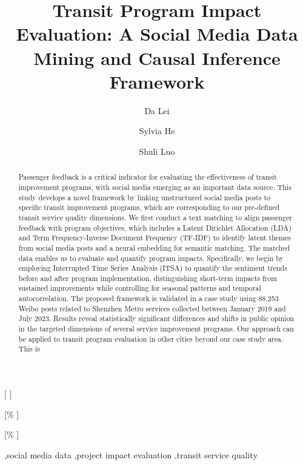 \documentclass[a4paper,fleqn,12pt]{cas-sc}
\begin{document}
\let\WriteBookmarks\relax
\def\floatpagepagefraction{1}
\def\textpagefraction{.001}

\title [mode = title]{Transit Program Impact Evaluation: A Social Media Data Mining and Causal Inference Framework} 

\author[1]{Da Lei}[%
]

\address[1]{Department of Geography and Resource Management, The Chinese University of Hong Kong, Hong Kong, China}
\address[2]{School of Humanities and Social Science, The Chinese University of Hong Kong, Shenzhen, China}


\author[1]{Sylvia He}[\%
]
\cormark[1]

\author[2]{Shuli Luo}[\%
]



\begin{abstract}
Passenger feedback is a critical indicator for evaluating the effectiveness of transit improvement programs, with social media emerging as an important data source. This study develops a novel framework by linking unstructured social media posts to specific transit improvement programs, which are corresponding to our pre-defined transit service quality dimensions. We first conduct a text matching to align passenger feedback with program objectives, which includes a Latent Dirichlet Allocation (LDA) and Term Frequency-Inverse Document Frequency (TF-IDF) to identify latent themes from social media posts and a neural embedding for semantic matching. The matched data enables us to evaluate and quantify program impacts. Specifically, we begin by employing Interrupted Time Series Analysis (ITSA) to quantify the sentiment trends before and after program implementation, distinguishing short-term impacts from sustained improvements while controlling for seasonal patterns and temporal autocorrelation. The proposed framework is validated in a case study using 88,253 Weibo posts related to Shenzhen Metro services collected between January 2019 and July 2023. Results reveal statistically significant differences and shifts in public opinion in the targeted dimensions of several service improvement programs. Our approach can be applied to transit program evaluation in other cities beyond our case study area. This is 
\end{abstract}

\begin{keywords}
 \sep social media data \sep project impact evaluation \sep transit service quality
\end{keywords}
\end{document}
